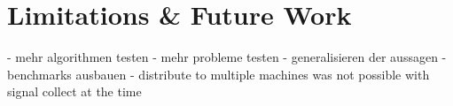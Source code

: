 \chapter{Limitations \& Future Work}
\label{c:limitations}

- mehr algorithmen testen
- mehr probleme testen
- generalisieren der aussagen
- benchmarks ausbauen
- distribute to multiple machines was not possible with signal collect at the time

 